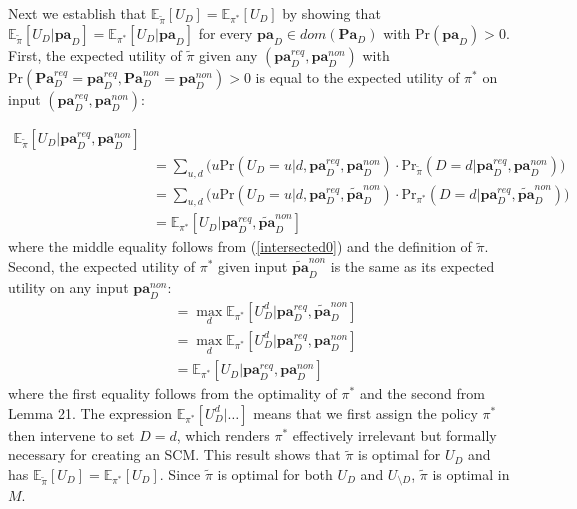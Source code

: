 \documentclass[letterpaper,10pt]{article}
\begin{document}
Next we establish that $\mathbb{E}_{\tilde{\pi}} [U_{D}]=\mathbb{E}_{\pi^*} [U_{D}]$ by showing that $\mathbb{E}_{\tilde{\pi}} [U_{D}|\mathbf{pa}_D] = \mathbb{E}_{\pi^*} [U_{D}|\mathbf{pa}_D]$ for every $\mathbf{pa}_D\in dom(\mathbf{Pa}_D)$ with $\text{Pr}(\mathbf{pa}_D)>0$.
First, the expected utility of $\tilde{\pi}$ given any $(\mathbf{pa}_D^{req},\mathbf{pa}^{non}_D)$ with $\text{Pr}(\mathbf{Pa}_D^{req}=\mathbf{pa}_D^{req},\mathbf{Pa}^{non}_D=\mathbf{pa}^{non}_D)>0$ is equal to the expected utility of $\pi^*$ on input $(\mathbf{pa}_D^{req},\mathbf{pa}^{non}_D)$:

\begin{align*}
\mathbb{E}_{\tilde{\pi}} [U_{D}|\mathbf{pa}_D^{req},\mathbf{pa}^{non}_D] \\
&= \sum_{u,d}\big(u\text{Pr}(U_D=u|d,\mathbf{pa}_D^{req},\mathbf{pa}^{non}_D) 
\cdot \text{Pr}_{\tilde{\pi}} (D=d|\mathbf{pa}_D^{req},\mathbf{pa}^{non}_D) \big)\\
&= \sum_{u,d}\big(u\text{Pr}(U_D=u|d,\mathbf{pa}_D^{req},\mathbf{\tilde{pa}}^{non}_D) 
\cdot \text{Pr}_{\pi^*} (D=d|\mathbf{pa}_D^{req},\mathbf{\tilde{pa}}^{non}_D) \big)\\
&= \mathbb{E}_{\pi^*} [U_{D}|\mathbf{pa}_D^{req},\mathbf{\tilde{pa}}^{non}_D]
\end{align*}
where the middle equality follows from (\ref{intersected0}) and the definition of $\tilde{\pi}$. 
Second, the expected utility of $\pi^*$ given input $\mathbf{\tilde{pa}}^{non}_D$ is the same as its expected utility on any input $\mathbf{pa}^{non}_D$:
\begin{align*}
&= \max_{d} \mathbb{E}_{\pi^*} [U_{D}^d|\mathbf{pa}_D^{req},\mathbf{\tilde{pa}}^{non}_D] \\
&= \max_{d} \mathbb{E}_{\pi^*} [U_{D}^d|\mathbf{pa}_D^{req},\mathbf{pa}^{non}_D] \\
&= \mathbb{E}_{\pi^*} [U_{D}|\mathbf{pa}_D^{req},\mathbf{pa}^{non}_D]
\end{align*}
where the first equality follows from the optimality of $\pi^*$ and the second from Lemma 21. 
The expression $\mathbb{E}_{\pi^*} [U_{D}^d|\hdots]$ means that we first assign the policy $\pi^*$ then intervene to set $D=d$, which renders $\pi^*$ effectively irrelevant but formally necessary for creating an SCM.
This result shows that $\tilde{\pi}$ is optimal for $U_D$ and has $\mathbb{E}_{\tilde{\pi}} [U_{D}]=\mathbb{E}_{\pi^*} [U_{D}]$.
Since $\tilde{\pi}$ is optimal for both $U_D$ and $U_{\setminus D}$, $\tilde{\pi}$ is optimal in $M$.
\end{document}
